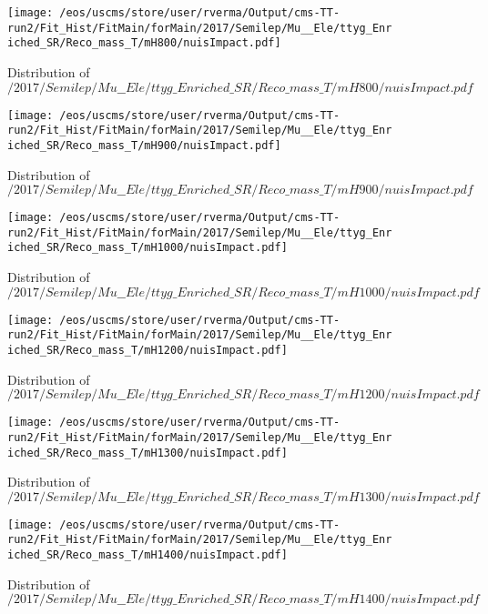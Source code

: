\begin{figure}
\centering
\texttt{[image: /eos/uscms/store/user/rverma/Output/cms-TT-run2/Fit\_Hist/FitMain/forMain/2017/Semilep/Mu\_\_Ele/ttyg\_Enriched\_SR/Reco\_mass\_T/mH800/nuisImpact.pdf]}
\caption{Distribution of $/2017/Semilep/Mu\_\_Ele/ttyg\_Enriched\_SR/Reco\_mass\_T/mH800/nuisImpact.pdf$}
\end{figure}

\begin{figure}
\centering
\texttt{[image: /eos/uscms/store/user/rverma/Output/cms-TT-run2/Fit\_Hist/FitMain/forMain/2017/Semilep/Mu\_\_Ele/ttyg\_Enriched\_SR/Reco\_mass\_T/mH900/nuisImpact.pdf]}
\caption{Distribution of $/2017/Semilep/Mu\_\_Ele/ttyg\_Enriched\_SR/Reco\_mass\_T/mH900/nuisImpact.pdf$}
\end{figure}

\begin{figure}
\centering
\texttt{[image: /eos/uscms/store/user/rverma/Output/cms-TT-run2/Fit\_Hist/FitMain/forMain/2017/Semilep/Mu\_\_Ele/ttyg\_Enriched\_SR/Reco\_mass\_T/mH1000/nuisImpact.pdf]}
\caption{Distribution of $/2017/Semilep/Mu\_\_Ele/ttyg\_Enriched\_SR/Reco\_mass\_T/mH1000/nuisImpact.pdf$}
\end{figure}

\begin{figure}
\centering
\texttt{[image: /eos/uscms/store/user/rverma/Output/cms-TT-run2/Fit\_Hist/FitMain/forMain/2017/Semilep/Mu\_\_Ele/ttyg\_Enriched\_SR/Reco\_mass\_T/mH1200/nuisImpact.pdf]}
\caption{Distribution of $/2017/Semilep/Mu\_\_Ele/ttyg\_Enriched\_SR/Reco\_mass\_T/mH1200/nuisImpact.pdf$}
\end{figure}

\begin{figure}
\centering
\texttt{[image: /eos/uscms/store/user/rverma/Output/cms-TT-run2/Fit\_Hist/FitMain/forMain/2017/Semilep/Mu\_\_Ele/ttyg\_Enriched\_SR/Reco\_mass\_T/mH1300/nuisImpact.pdf]}
\caption{Distribution of $/2017/Semilep/Mu\_\_Ele/ttyg\_Enriched\_SR/Reco\_mass\_T/mH1300/nuisImpact.pdf$}
\end{figure}

\begin{figure}
\centering
\texttt{[image: /eos/uscms/store/user/rverma/Output/cms-TT-run2/Fit\_Hist/FitMain/forMain/2017/Semilep/Mu\_\_Ele/ttyg\_Enriched\_SR/Reco\_mass\_T/mH1400/nuisImpact.pdf]}
\caption{Distribution of $/2017/Semilep/Mu\_\_Ele/ttyg\_Enriched\_SR/Reco\_mass\_T/mH1400/nuisImpact.pdf$}
\end{figure}


